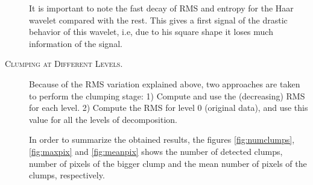 \documentclass[letter, 11pt]{article}
\begin{document}
\begin{description}
    It is important to note the fast decay of RMS and entropy for the Haar wavelet compared with the rest. This gives a first signal of the drastic behavior of this wavelet, i.e, due to his square shape it loses much information of the signal.



    \item[\textsc{Clumping at Different Levels.}] Because of the RMS variation explained above, two approaches are taken to perform the clumping stage: 1) Compute and use the (decreasing) RMS for each level. 2) Compute the RMS for level $0$ (original data), and use this value for all the levels of decomposition.

    In order to summarize the obtained results, the figures \ref{fig:numclumps}, \ref{fig:maxpix} and \ref{fig:meanpix} shows the number of detected clumps, number of pixels of the bigger clump and  the mean number of pixels of the clumps, respectively.  


\end{description}
\end{document}
